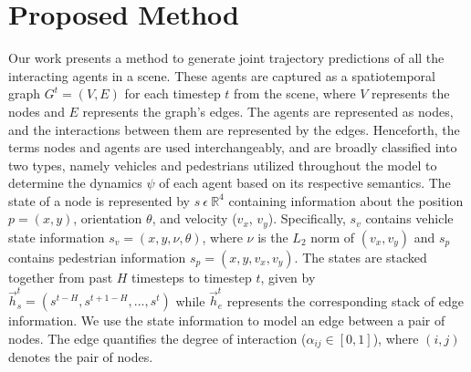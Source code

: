 \documentclass{article}
\begin{document}
\section{Proposed Method}\vspace{-10pt}
Our work presents a method to generate joint trajectory predictions of all the interacting agents in a scene. These agents are captured as a spatiotemporal graph $G^t = (V,E)$ for each timestep $t$ from the scene, where $V$ represents the nodes and $E$ represents the graph's edges. The agents are represented as nodes, and the interactions between them are represented by the edges. Henceforth, the terms nodes and agents are used interchangeably,  and are broadly classified into two types, namely vehicles and pedestrians utilized throughout the model to determine the dynamics $\psi$ of each agent based on its respective semantics. The state of a node is represented by $s\ \epsilon\ \mathbb{R}^4$ containing information about the position $p = (x,y)$, orientation $\theta$, and velocity ($v_x$, $v_y$). Specifically, $s_v$ contains vehicle state information $s_v = (x,y, \nu, \theta)$,  where $\nu$ is the $L_2$ norm of $(v_x, v_y)$ and $s_p$ contains pedestrian information $s_p= (x,y,v_x,v_y)$. The states are stacked together from past $H$ timesteps to timestep $t$, given by $\vec h^t_s = (s^{t-H}, s^{t+1-H}, ..., s^t)$ while $\vec h^t_e$ represents the corresponding stack of edge information. We use the state information to model an edge between a pair of nodes. The edge quantifies the degree of interaction ($\alpha_{ij} \in [0,1]$), where $(i,j)$ denotes the pair of nodes.  
\end{document}
